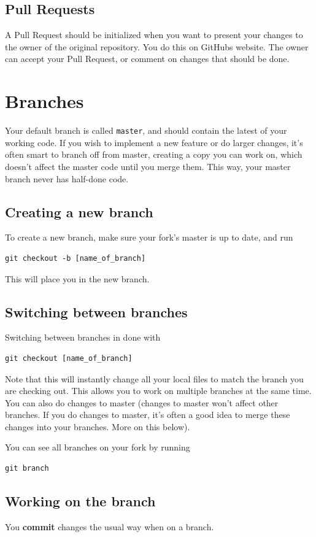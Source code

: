 \documentclass[12p,a4paper]{article}
\begin{document}
\subsection{Pull Requests}
A Pull Request should be initialized when you want to present your changes to the owner of the original repository. You do this on GitHubs website. The owner can accept your Pull Request, or comment on changes that should be done.


\newpage
\section{Branches}
Your default branch is called \texttt{master}, and should contain the latest of your working code. If you wish to implement a new feature or do larger changes, it's often smart to branch off from master, creating a copy you can work on, which doesn't affect the master code until you merge them. This way, your master branch never has half-done code.

\subsection{Creating a new branch}
To create a new branch, make sure your fork's master is up to date, and run
\begin{verbatim}
git checkout -b [name_of_branch]
\end{verbatim}
This will place you in the new branch.

\subsection{Switching between branches}
Switching between branches in done with
\begin{verbatim}
git checkout [name_of_branch]
\end{verbatim}
Note that this will instantly change all your local files to match the branch you are checking out. This allows you to work on multiple branches at the same time. You can also do changes to master (changes to master won't affect other branches. If you do changes to master, it's often a good idea to merge these changes into your branches. More on this below).

You can see all branches on your fork by running
\begin{verbatim}
git branch
\end{verbatim}

\subsection{Working on the branch}
You \textbf{commit} changes the usual way when on a branch.
\end{document}
